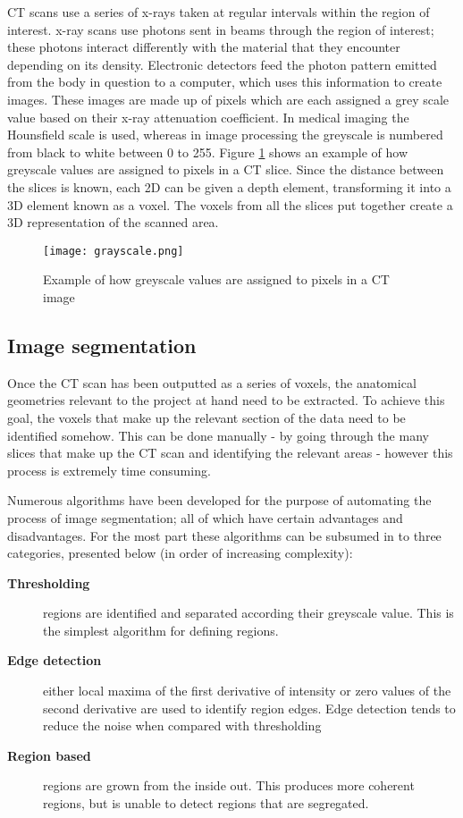 CT scans use a series of x-rays taken at regular intervals within the region of interest. x-ray scans use photons sent in beams through the region of interest; these photons interact differently with the material that they encounter depending on its density. Electronic detectors feed the photon pattern emitted from the body in question to a computer, which uses this information to create images. These images are made up of pixels which are each assigned a grey scale value based on their x-ray attenuation coefficient. In medical imaging the Hounsfield scale is used, whereas in image processing the greyscale is numbered from black to white between 0 to 255. Figure \ref{fig:greyscale} shows an  example of how greyscale values are assigned to pixels in a CT slice.
Since the distance between the slices is known, each 2D can be given a depth element, transforming it into a 3D element known as a voxel. The voxels from all the slices put together create a 3D representation of the scanned area.


\begin{figure} 
  \texttt{[image: grayscale.png]}
\caption{Example of how greyscale values are assigned to pixels in a CT image} \label{fig:greyscale}
\centering
\end{figure}
 
\subsection{Image segmentation} 

Once the CT scan has been outputted as a series of voxels, the anatomical geometries relevant to the project at hand need to be extracted. To achieve this goal, the voxels that make up the relevant section of the data need to be identified somehow. This can be done manually - by going through the many slices that make up the CT scan and identifying the relevant areas - however this process is extremely time consuming.

Numerous algorithms have been developed for the purpose of automating the process of image segmentation; all of which have certain advantages and disadvantages. For the most part these algorithms can be subsumed in to three categories, presented below (in order of increasing complexity):

\begin{description}

  \item[\textbf{Thresholding}] regions are identified and separated according their  greyscale value. This is the simplest algorithm for defining regions.
 
  \item[\textbf{Edge detection}] either local maxima of the first derivative of intensity or zero values of the second derivative are used to identify region edges. Edge detection tends to reduce the noise when compared with thresholding

 
  \item[\textbf{Region based}] regions are grown from the inside out. This produces more coherent regions, but is unable to detect regions that are segregated.

\end{description}

